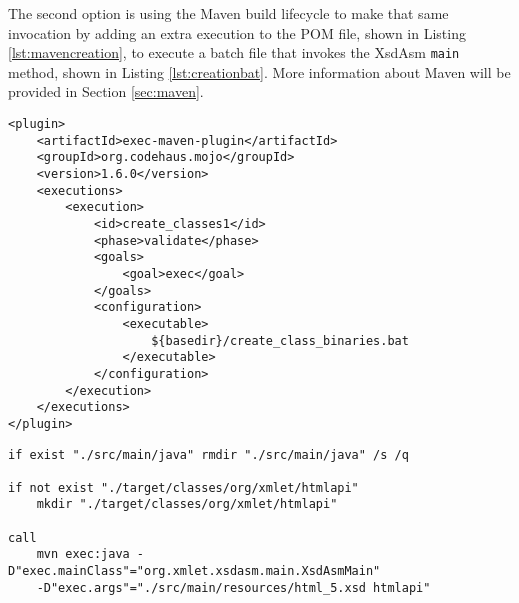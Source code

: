 \noindent
The second option is using the Maven\cite{maven} build lifecycle\cite{mavenlifecycle} to make that same invocation by adding an extra execution to the \ac{POM} file, shown in Listing \ref{lst:mavencreation}, to execute a batch file that invokes the XsdAsm \texttt{main} method, shown in Listing \ref{lst:creationbat}. More information about Maven will be provided in Section \ref{sec:maven}.

\bigskip


\begin{minipage}{\linewidth}
\begin{lstlisting}[caption={Maven - Compiling Classes using a Plugin},label={lst:mavencreation}]
<plugin>
    <artifactId>exec-maven-plugin</artifactId>
    <groupId>org.codehaus.mojo</groupId>
    <version>1.6.0</version>
    <executions>
        <execution>
            <id>create_classes1</id>
            <phase>validate</phase>
            <goals>
                <goal>exec</goal>
            </goals>
            <configuration>
                <executable>
                    ${basedir}/create_class_binaries.bat
                </executable>
            </configuration>
        </execution>
    </executions>
</plugin>
\end{lstlisting}
\end{minipage}


\begin{minipage}{\linewidth}
\begin{lstlisting}[caption={Maven - The Code that creates the Fluent Interface Classes (create\_class\_binaries.bat)},label={lst:creationbat}]
if exist "./src/main/java" rmdir "./src/main/java" /s /q

if not exist "./target/classes/org/xmlet/htmlapi" 
    mkdir "./target/classes/org/xmlet/htmlapi"

call 
    mvn exec:java -D"exec.mainClass"="org.xmlet.xsdasm.main.XsdAsmMain" 
    -D"exec.args"="./src/main/resources/html_5.xsd htmlapi"
\end{lstlisting}
\end{minipage}

